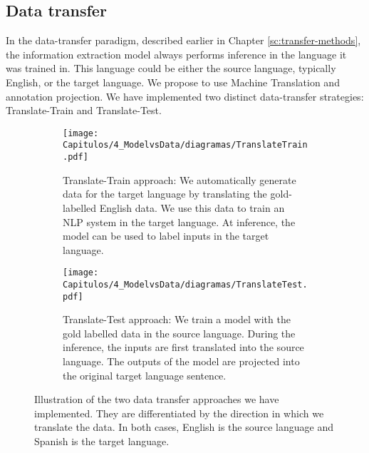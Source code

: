 \subsection{Data transfer}

In the data-transfer paradigm, described earlier in Chapter \ref{sc:transfer-methods}, the information extraction model always performs inference in the language it was trained in. This language could be either the source language, typically English, or the target language. We propose to use Machine Translation and annotation projection. We have implemented two distinct data-transfer strategies: Translate-Train and Translate-Test.

\begin{figure}
\centering
\begin{subfigure}{.45\textwidth}
  \centering
  \texttt{[image: Capitulos/4\_ModelvsData/diagramas/TranslateTrain.pdf]}
  \caption{Translate-Train approach: We automatically generate data for the target language by translating the gold-labelled English data. We use this data to train an NLP system in the target language. At inference, the model can be used to label inputs in the target language.}
  \label{fig:Translate_train}
\end{subfigure}\hfill
\begin{subfigure}{.45\textwidth}
  \centering
  \texttt{[image: Capitulos/4\_ModelvsData/diagramas/TranslateTest.pdf]}
  \caption{Translate-Test approach: We train a model with the gold labelled data in the source language. During the inference, the inputs are first translated into the source language. The outputs of the model are projected into the original target language sentence.}
  
  \label{fig:Translate_test}
\end{subfigure}
\caption{Illustration of the two data transfer approaches we have implemented. They are differentiated by the direction in which we translate the data. In both cases, English is the source language and Spanish is the target language.}
\label{fig:Translate_train_vs_translate_test}
\end{figure}

